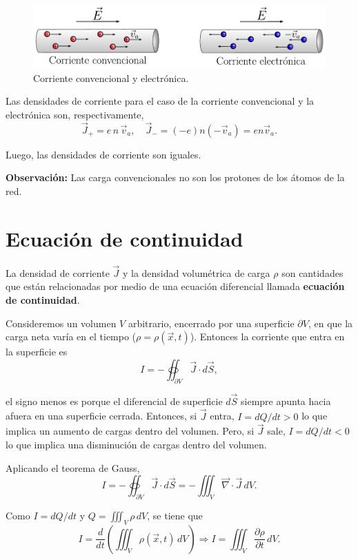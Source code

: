 \begin{figure}[H]
    \centering
    \includegraphics[scale = 0.89]{Figuras/Corriente-Convencional.pdf}
    \caption{Corriente convencional y electrónica.}
    \label{fig:Corriente-Convencional}
\end{figure}

Las densidades de corriente para el caso de la corriente convencional y la electrónica son, respectivamente,
$$\vec{J}_{+} = e\, n \,\vec{v}_{a}, \quad \Vec{J}_{-} = (-e) n (-\vec{v}_{a}) = e n \vec{v}_{a}.$$

Luego, las densidades de corriente son iguales.

\textbf{Observación:} Las carga convencionales no son los protones de los átomos de la red.

\section{Ecuación de continuidad}

La densidad de corriente $\vec{J}$ y la densidad volumétrica de carga $\rho$ son cantidades que están relacionadas por medio de una ecuación diferencial llamada \textbf{ecuación de continuidad}.

Consideremos un volumen $V$ arbitrario, encerrado por una superficie $\partial V$, en que la carga neta varía en el tiempo ($\rho = \rho(\vec{x},t)$). Entonces la corriente que entra en la superficie es
$$I = - \oiint_{\partial V} \vec{J} \cdot d\vec{S},$$

el signo menos es porque el diferencial de superficie $d\vec{S}$ siempre apunta hacia afuera en una superficie cerrada. Entonces, si $\vec{J}$ entra, $I = dQ/dt > 0$ lo que implica un aumento de cargas dentro del volumen. Pero, si $\vec{J}$ sale, $I = dQ/dt < 0$ lo que implica una disminución de cargas dentro del volumen.

Aplicando el teorema de Gauss,
\begin{equation}
I = - \oiint_{\partial V} \vec{J} \cdot d\vec{S} = - \iiint_V \vec{\nabla} \cdot \vec{J} \,dV. \label{Continuidad1}
\end{equation}

Como $I = dQ/dt$ y $Q = \iiint_V \rho \,dV$, se tiene que
\begin{equation}
I = \frac{d}{dt} \left( \iiint_V \rho(\vec{x},t) \,dV \right) \Rightarrow I = \iiint_V \frac{\partial \rho}{\partial t} \,dV.  \label{Continuidad2}
\end{equation}

